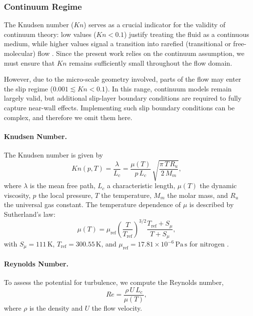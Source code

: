 \subsubsection{Continuum Regime}
The Knudsen number (\(Kn\)) serves as a crucial indicator for the validity of continuum theory: low values (\(Kn < 0.1\)) justify treating the fluid as a continuous medium, while higher values signal a transition into rarefied (transitional or free-molecular) flow \cite{halwidl_development_2016,anderson2021modern}. Since the present work relies on the continuum assumption, we must ensure that \(Kn\) remains sufficiently small throughout the flow domain. 

However, due to the micro-scale geometry involved, parts of the flow may enter the slip regime (\(0.001 \lesssim Kn < 0.1\)). In this range, continuum models remain largely valid, but additional slip-layer boundary conditions are required to fully capture near-wall effects. Implementing such slip boundary conditions can be complex, and therefore we omit them here.

\paragraph{Knudsen Number.}
	The Knudsen number is given by
	\begin{equation}
	  Kn(p,T) 
	  = \frac{\lambda}{L_c} 
	  = \frac{\mu(T)}{p\,L_c}\,\sqrt{\frac{\pi\,T\,R_u}{2\,M_m}},
	\end{equation}
	where \(\lambda\) is the mean free path, \(L_c\) a characteristic length, \(\mu(T)\) the dynamic viscosity, \(p\) the local pressure, \(T\) the temperature, \(M_m\) the molar mass, and \(R_u\) the universal gas constant. The temperature dependence of \(\mu\) is described by Sutherland’s law:
	\begin{equation}
	  \mu(T)
	  = \mu_{\text{ref}}
	    \left(\frac{T}{T_{\text{ref}}}\right)^{3/2}
	    \frac{T_{\text{ref}} + S_\mu}{T + S_\mu},
	\end{equation}
	with \(S_\mu=111\,\mathrm{K}\), \(T_{\text{ref}}=300.55\,\mathrm{K}\), and \(\mu_{\text{ref}}=17.81 \times 10^{-6}\,\mathrm{Pa\,s}\) for nitrogen \cite{kim2004numericalanalysisflowcharacteristics}.

	\paragraph{Reynolds Number.}
	To assess the potential for turbulence, we compute the Reynolds number,
	\begin{equation}
	  Re = \frac{\rho\,U\,L_c}{\mu(T)},
	\end{equation}
	where \(\rho\) is the density and \(U\) the flow velocity.

